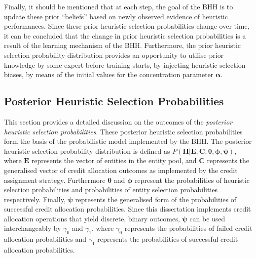 Finally, it should be mentioned that at each step, the goal of the \acs{BHH} is to update these prior ``beliefs'' based on newly observed evidence of heuristic performances. Since these prior heuristic selection probabilities change over time, it can be concluded that the change in prior heuristic selection probabilities is a result of the learning mechanism of the \acs{BHH}. Furthermore, the prior heuristic selection probability distribution provides an opportunity to utilise prior knowledge by some expert before training starts, by injecting heuristic selection biases, by means of the initial values for the concentration parameter $\boldsymbol{\alpha}$.




\subsection{Posterior Heuristic Selection Probabilities}\label{sec:results:case_study:posterior_selec_prob}

This section provides a detailed discussion on the outcomes of the \textit{posterior heuristic selection probabilities}. These posterior heuristic selection probabilities form the basis of the probabilistic model implemented by the \acs{BHH}. The posterior heuristic selection probability distribution is defined as $P(\boldsymbol{H} \vert \boldsymbol{E}, \boldsymbol{C}; \boldsymbol{\theta}, \boldsymbol{\phi}, \boldsymbol{\psi})$, where $\boldsymbol{E}$ represents the vector of entities in the entity pool, and $\boldsymbol{C}$ represents the generalised vector of credit allocation outcomes as implemented by the credit assignment strategy. Furthermore $\boldsymbol{\theta}$ and $\boldsymbol{\phi}$ represent the probabilities of heuristic selection probabilities and probabilities of entity selection probabilities respectively. Finally, $\boldsymbol{\psi}$ represents the generalised form of the probabilities of successful credit allocation probabilities. Since this dissertation implements credit allocation operations that yield discrete, binary outcomes, $\boldsymbol{\psi}$ can be used interchangeably by $\gamma_{0}$ and $\gamma_{1}$, where $\gamma_{0}$ represents the probabilities of failed credit allocation probabilities and $\gamma_{1}$ represents the probabilities of successful credit allocation probabilities.

